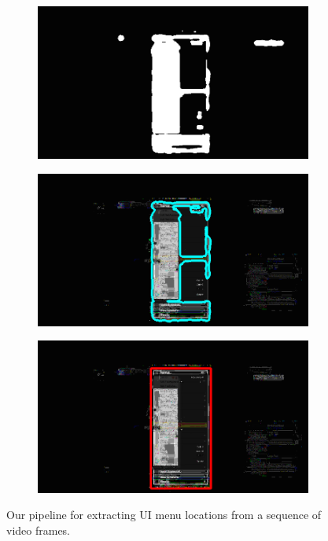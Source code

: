 \documentclass[10pt]{article}
\begin{document}
\begin{figure}
\begin{subfigure}{0.3\textwidth}
        \caption{}
        \label{fig:pipeline3}
        \vspace*{2mm}
    \end{subfigure}
    \begin{subfigure}{0.3\textwidth}
        \includegraphics[width=\textwidth]{fig/pipeline4}
        \caption{}
        \label{fig:pipeline4}
    \end{subfigure}
    \begin{subfigure}{0.3\textwidth}
        \includegraphics[width=\textwidth]{fig/pipeline5}
        \caption{}
        \label{fig:pipeline5}
    \end{subfigure}
    \begin{subfigure}{0.3\textwidth}
        \includegraphics[width=\textwidth]{fig/pipeline6}
        \caption{}
        \label{fig:pipeline6}
    \end{subfigure}
    \caption{Our pipeline for extracting UI menu locations from a sequence of video frames.}
\end{figure}
\end{document}
